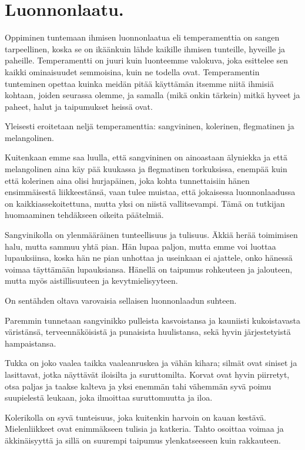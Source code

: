 \documentclass[11pt, twoside, finnish, a5paper]{book}
\begin{document}
\chapter*{Luonnonlaatu.}

Oppiminen  tuntemaan  ihmisen luonnonlaatua eli
temperamenttia on sangen tarpeellinen, koska se on
ikäänkuin lähde kaikille ihmisen tunteille, hyveille ja
paheille. Temperamentti on juuri kuin luonteemme
valokuva, joka esittelee sen kaikki ominaisuudet semmoisina,
kuin ne todella ovat. Temperamentin tunteminen opettaa kuinka meidän pitää käyttämän itsemme niitä ihmisiä kohtaan, joiden seurassa olemme,
ja samalla (mikä onkin tärkein) mitkä hyveet ja paheet, halut ja
taipumukset heissä ovat.

Yleisesti eroitetaan neljä temperamenttia: sangvininen,
kolerinen, flegmatinen ja melangolinen.

Kuitenkaan emme saa luulla, että sangvininen on
ainoastaan älyniekka ja että melangolinen aina käy pää
kuukassa ja flegmatinen torkuksissa, enempää kuin että
kolerinen aina olisi hurjapäinen, joka kohta tunnettaisiin
hänen ensimmäisestä liikkeestänsä, vaan tulee muistaa,
että jokaisessa luonnonlaadussa on kaikkiassekoitettuna,
mutta yksi  on niistä vallitsevampi.  Tämä on tutkijan
huomaaminen tehdäkseen oikeita päätelmiä.

Sangvinikolla on ylenmääräinen tunteellisuus ja tulisuus.
Äkkiä herää toimimisen halu, mutta sammuu
yhtä pian. Hän lupaa paljon, mutta emme voi luottaa
lupauksiinsa, koska hän ne pian unhottaa ja useinkaan
ei ajattele, onko hänessä voimaa täyttämään lupauksiansa.
Hänellä on taipumus rohkeuteen ja jalouteen,
mutta myös aistillisuuteen ja kevytmielisyyteen.

On sentähden oltava varovaisia sellaisen luonnonlaadun suhteen.

Paremmin tunnetaan sangvinikko
pulleista kasvoistansa ja kauniisti kukoistavasta
väristänsä, terveennäköisistä ja punaisista huulistansa,
sekä hyvin järjestetyistä hampaistansa.

Tukka on joko vaalea taikka vaaleanruskea ja vähän
kihara; silmät ovat siniset ja lasittavat, jotka näyttävät
iloisilta ja suruttomilta. Korvat ovat hyvin piirretyt, otsa
paljas ja taakse kalteva ja yksi enemmän tahi
vähemmän syvä poimu suupielestä leukaan, joka ilmoittaa
suruttomuutta ja iloa.

Kolerikolla on syvä tunteisuus, joka kuitenkin harvoin
on kauan kestävä. Mielenliikkeet ovat enimmäkseen
tulisia ja katkeria. Tahto osoittaa voimaa ja
äkkinäisyyttä ja sillä on suurempi taipumus ylenkatseeseen kuin
rakkauteen.
\end{document}
